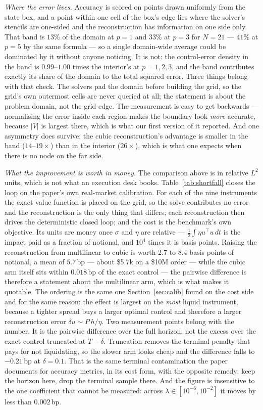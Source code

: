 \documentclass[conference]{IEEEtran}
\begin{document}
\emph{Where the error lives.} Accuracy is scored on points drawn uniformly from the state box, and a
point within one cell of the box's edge lies where the solver's stencils are one-sided and the
reconstruction has information on one side only. That band is $13\%$ of the domain at $p=1$ and
$33\%$ at $p=3$ for $N=21$ --- $41\%$ at $p=5$ by the same formula --- so a single domain-wide
average could be dominated by it without anyone noticing. It is not: the control-error density in
the band is $0.99$--$1.00$ times the interior's at $p = 1, 2, 3$, and the band contributes exactly
its share of the domain to the total squared error. Three things belong with that check. The solvers
pad the domain before building the grid, so the grid's own outermost cells are never queried at all;
the statement is about the problem domain, not the grid edge. The measurement is easy to get
backwards --- normalising the error inside each region makes the boundary look \emph{more} accurate,
because $|V|$ is largest there, which is what our first version of it reported. And one asymmetry
does survive: the cubic reconstruction's advantage is smaller in the band ($14$--$19\times$) than in
the interior ($26\times$), which is what one expects when there is no node on the far side.

\emph{What the improvement is worth in money.} The comparison above is in relative $L^2$ units, which
is not what an execution desk books. Table~\ref{tab:shortfall} closes the loop on the paper's own
real-market calibration. For each of the nine instruments the exact value function is placed on the
grid, so the solve contributes no error and the reconstruction is the only thing that differs; each
reconstruction then drives the deterministic closed loop; and the cost is the benchmark's own
objective. Its units are money once $\sigma$ and $\eta$ are relative --- $\tfrac12\int \eta u^\top u\,dt$
is the impact paid as a fraction of notional, and $10^4$ times it is basis points. Raising the reconstruction
from multilinear to cubic is worth $2.7$ to $8.4$ basis points of notional, a mean of $5.7$\,bp ---
about \$5.7k on a \$10M order --- while the cubic arm itself sits within $0.018$\,bp of the exact
control --- the pairwise difference is therefore a statement about the multilinear arm, which is what
makes it quotable. The ordering is the same one Section~\ref{sec:calib} found on the cost side and for
the same reason: the effect is largest on the \emph{most} liquid instrument, because a tighter spread
buys a larger optimal control and therefore a larger reconstruction error $\delta u \sim P\,h/\eta$.
Two measurement points belong with the number. It is the pairwise difference over the full horizon,
not the excess over the exact control truncated at $T-\delta$. Truncation removes the terminal penalty
that pays for not liquidating, so the slower arm looks cheap and the difference falls to $-0.21$\,bp at
$\delta = 0.1$. That is the same terminal contamination the paper documents for accuracy metrics, in its
cost form, with the opposite remedy: keep the horizon here, drop the terminal sample there. And the
figure is insensitive to the one coefficient that cannot be measured: across
$\lambda \in [10^{-6}, 10^{-2}]$ it moves by less than $0.002$\,bp.
\end{document}
